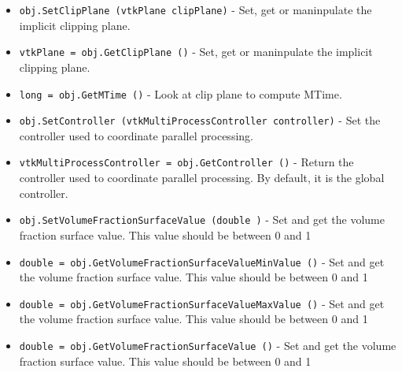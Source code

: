 \begin{itemize}
\item  \verb|obj.SetClipPlane (vtkPlane clipPlane)| -  Set, get or maninpulate the implicit clipping plane.

\item  \verb|vtkPlane = obj.GetClipPlane ()| -  Set, get or maninpulate the implicit clipping plane.

\item  \verb|long = obj.GetMTime ()| -  Look at clip plane to compute MTime.

\item  \verb|obj.SetController (vtkMultiProcessController controller)| -  Set the controller used to coordinate parallel processing.

\item  \verb|vtkMultiProcessController = obj.GetController ()| -  Return the controller used to coordinate parallel processing. By default,
 it is the global controller.

\item  \verb|obj.SetVolumeFractionSurfaceValue (double )| -  Set and get the volume fraction surface value. This value should be
 between 0 and 1

\item  \verb|double = obj.GetVolumeFractionSurfaceValueMinValue ()| -  Set and get the volume fraction surface value. This value should be
 between 0 and 1

\item  \verb|double = obj.GetVolumeFractionSurfaceValueMaxValue ()| -  Set and get the volume fraction surface value. This value should be
 between 0 and 1

\item  \verb|double = obj.GetVolumeFractionSurfaceValue ()| -  Set and get the volume fraction surface value. This value should be
 between 0 and 1

\end{itemize}
